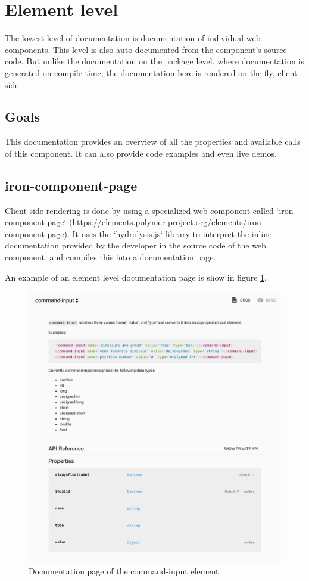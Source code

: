 \section{Element level}
The lowest level of documentation is documentation of individual web components.
This level is also auto-documented from the component's source code.
But unlike the documentation on the package level, where documentation is
generated on compile time, the documentation here is rendered on the fly, client-side.


\subsection{Goals}
This documentation provides an overview of all the properties and available
calls of this component. It can also provide code examples and even live
demos.

\subsection{iron-component-page}
Client-side rendering is done by using a specialized web component called `iron-component-page`
(\url{https://elements.polymer-project.org/elements/iron-component-page}).
It uses the `hydrolysis.js` library to interpret the inline documentation provided
by the developer in the source code of the web component, and compiles this into
a documentation page.

An example of an element level documentation page is show in figure \ref{fig:elementdocumentation}.
\begin{figure}
  \centering
  \includegraphics[width=\textwidth]{images/element-documentation}
  \caption{Documentation page of the command-input element}
  \label{fig:elementdocumentation}
\end{figure}
